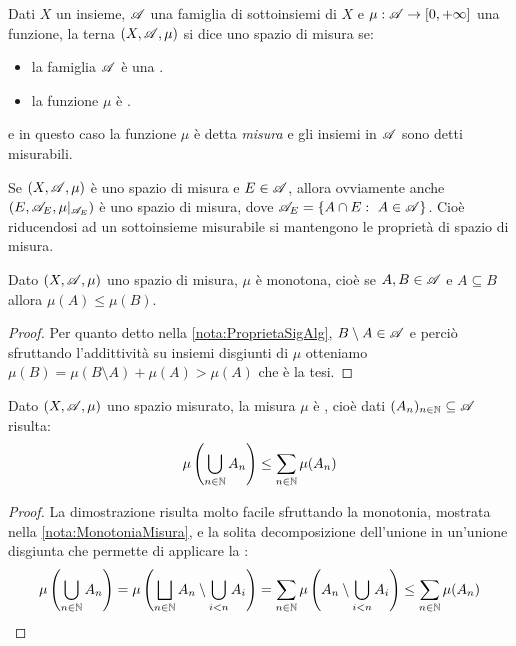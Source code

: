 \begin{definition}
	Dati $X$ un insieme, $\mathscr A$ una famiglia di sottoinsiemi di $X$ e $\mu:\mathscr A\to [0,+\infty]$ una funzione, la terna $(X,\mathscr A, \mu)$ si dice uno spazio di misura se:
	\begin{itemize}
		\item la famiglia $\mathscr A$ è una \sigalg{}.
		\item la funzione $\mu$ è \sigadd{}.
	\end{itemize}
	e in questo caso la funzione $\mu$ è detta \emph{misura} e gli insiemi in $\mathscr A$ sono detti misurabili.
\end{definition}

\begin{remark}\label{nota:RiduzioneMisura}
	Se $(X,\mathscr A,\mu)$ è uno spazio di misura e $E\in\mathscr A$, allora ovviamente anche $(E,\mathscr A_E,\mu|_{\mathscr A_E})$ è uno spazio di misura, dove $\A_E=\{A\cap E:\ A\in\A\}$. Cioè riducendosi ad un sottoinsieme misurabile si mantengono le proprietà di spazio di misura.
\end{remark}

\begin{remark}\label{nota:MonotoniaMisura}
	Dato $(X,\mathscr A,\mu)$ uno spazio di misura, $\mu$ è monotona, cioè se $A,B\in\mathscr A$ e $A\subseteq B$ allora $\mu(A)\le \mu(B)$.
\end{remark}
\begin{proof}
	Per quanto detto nella \cref{nota:ProprietaSigAlg}, $B\setminus A\in\mathscr A$ e perciò sfruttando l'addittività su insiemi disgiunti di $\mu$ otteniamo $\mu(B)=\mu(B\setminus A)+\mu(A)>\mu(A)$ che è la tesi.
\end{proof}
\begin{remark}\label{nota:SubAdditivitaMisura}
	Dato $(X,\mathscr A,\mu)$ uno spazio misurato, la misura $\mu$ è \sigsubadd{}, cioè dati $(A_n)_{n\in\mathbb N}\subseteq\mathscr A$ risulta:
	\begin{equation*}
		\mu\left(\bigcup_{n\in\mathbb N} A_n \right)\le \sum_{n\in\mathbb N}\mu(A_n)
	\end{equation*}
\end{remark}
\begin{proof}
	La dimostrazione risulta molto facile sfruttando la monotonia, mostrata nella \cref{nota:MonotoniaMisura}, e la solita decomposizione dell'unione in un'unione disgiunta che permette di applicare la \sigadd[ità]:
	\begin{equation*}
		\mu\left(\bigcup_{n\in\mathbb N} A_n \right)=\mu\left(\bigsqcup_{n\in\mathbb N} A_n\setminus\bigcup_{i<n}A_i \right)=
		\sum_{n\in\mathbb N}\mu\left(A_n\setminus\bigcup_{i<n}A_i\right)\le \sum_{n\in\mathbb N}\mu(A_n)
	\end{equation*}
\end{proof}



